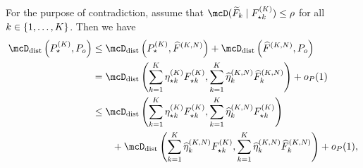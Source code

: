 For the purpose of contradiction, assume that $\discr{\widetilde{F}_{k}}{F^{(\numcomps)}_{\opt k}} \le \rho$ for all $k \in \{1,\ldots, K\}$. 
Then we have
\begin{align}
	 \distDisc\left(P^{(\numcomps)}_{\star}, P_{o}\right) 
	 & \le \distDisc\left(P^{(\numcomps)}_{\star}, \widehat{F}^{(\numcomps, \numobs)}\right) + \distDisc\left( \widehat{F}^{(\numcomps, \numobs)}, \datadist\right)\label{eq:trigin-ineq} \\
	 & = \distDisc\left(\sum_{k = 1}^{\numcomps}  \eta^{(\numcomps)}_{\star k}F^{(\numcomps)}_{\star k}, \sum_{k=1}^{\numcomps}\widehat{\eta}_k^{(\numcomps, \numobs)} \widehat{F}_k^{(\numcomps, \numobs)}\right) + \op(1) \label{eq:assump1a}\\
	 & \le \distDisc\left(\sum_{k = 1}^{\numcomps}  \eta^{(\numcomps)}_{\star k}F^{(\numcomps)}_{\star k}, \sum_{k = 1}^{\numcomps}  \widehat{\eta}_k^{(\numcomps, \numobs)} F^{(\numcomps)}_{\star k} \right) \\
   &\qquad + \distDisc\left(\sum_{k = 1}^{\numcomps}  \widehat{\eta}_k^{(\numcomps, \numobs)} F^{(\numcomps)}_{\star k}, \sum_{k=1}^{\numcomps}\widehat{\eta}_k^{(\numcomps, \numobs)} \widehat{F}_k^{(\numcomps, \numobs)}\right)
   + \op(1), \label{eq:decomp}
\end{align}
